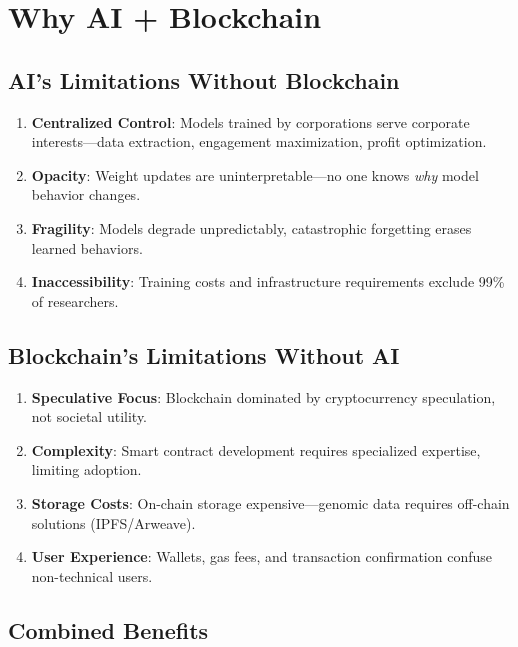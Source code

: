 \section{Why AI + Blockchain}


\subsection{AI's Limitations Without Blockchain}

\begin{enumerate}
    \item \textbf{Centralized Control}: Models trained by corporations serve corporate interests—data extraction, engagement maximization, profit optimization.
    \item \textbf{Opacity}: Weight updates are uninterpretable—no one knows \textit{why} model behavior changes.
    \item \textbf{Fragility}: Models degrade unpredictably, catastrophic forgetting erases learned behaviors.
    \item \textbf{Inaccessibility}: Training costs and infrastructure requirements exclude 99\% of researchers.
\end{enumerate}

\subsection{Blockchain's Limitations Without AI}

\begin{enumerate}
    \item \textbf{Speculative Focus}: Blockchain dominated by cryptocurrency speculation, not societal utility.
    \item \textbf{Complexity}: Smart contract development requires specialized expertise, limiting adoption.
    \item \textbf{Storage Costs}: On-chain storage expensive—genomic data requires off-chain solutions (IPFS/Arweave).
    \item \textbf{User Experience}: Wallets, gas fees, and transaction confirmation confuse non-technical users.
\end{enumerate}

\subsection{Combined Benefits}

